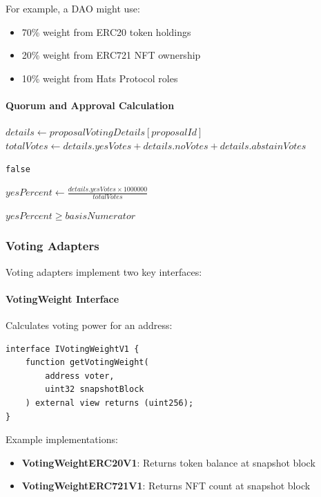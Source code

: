 For example, a DAO might use:
\begin{itemize}
    \item 70\% weight from ERC20 token holdings
    \item 20\% weight from ERC721 NFT ownership
    \item 10\% weight from Hats Protocol roles
\end{itemize}

\paragraph{Quorum and Approval Calculation}

\begin{algorithm}
\caption{Vote Tallying and Approval}
\begin{algorithmic}[1]
    \State $details \gets proposalVotingDetails[proposalId]$
    \State $totalVotes \gets details.yesVotes + details.noVotes + details.abstainVotes$

        \State \Return \texttt{false}
    \EndIf

    \State $yesPercent \gets \frac{details.yesVotes \times 1000000}{totalVotes}$

    \State \Return $yesPercent \geq basisNumerator$
\EndFunction
\end{algorithmic}
\end{algorithm}

\subsubsection{Voting Adapters}

Voting adapters implement two key interfaces:

\paragraph{VotingWeight Interface} Calculates voting power for an address:

\begin{lstlisting}[caption=VotingWeight Interface]
interface IVotingWeightV1 {
    function getVotingWeight(
        address voter,
        uint32 snapshotBlock
    ) external view returns (uint256);
}
\end{lstlisting}

Example implementations:
\begin{itemize}
    \item \textbf{VotingWeightERC20V1}: Returns token balance at snapshot block
    \item \textbf{VotingWeightERC721V1}: Returns NFT count at snapshot block
\end{itemize}

